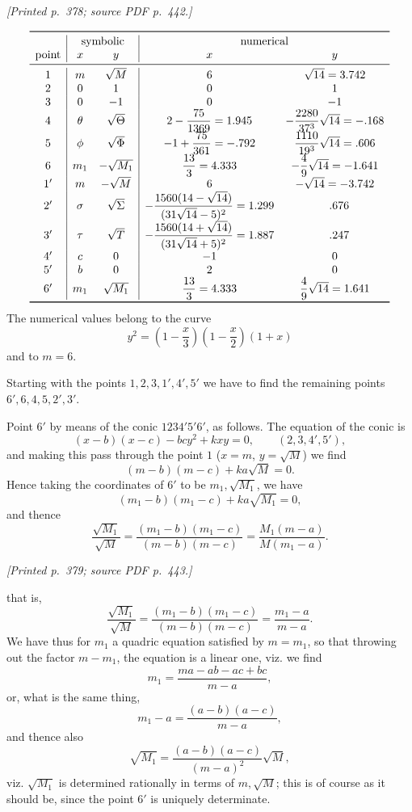 \documentclass[11pt,a4paper]{article}
\newcommand{\sourcepage}[2]{\par\smallskip\noindent\textit{[Printed p.~#1; source PDF p.~#2.]}\par\smallskip}
\begin{document}
\sourcepage{378}{442}
\[
\begin{array}{c|cc|cc}
\toprule
& \multicolumn{2}{c|}{\text{symbolic}} & \multicolumn{2}{c}{\text{numerical}}\\
\text{point} & x & y & x & y\\
\midrule
1  & m       & \sqrt M     & 6 & \sqrt{14}=3.742\\
2  & 0       & 1           & 0 & 1\\
3  & 0       & -1          & 0 & -1\\
4  & \theta  & \sqrt\Theta & 2-\dfrac{75}{1369}=1.945
   & -\dfrac{2280}{37^3}\sqrt{14}=-.168\\
5  & \phi    & \sqrt\Phi   & -1+\dfrac{75}{361}=-.792
   & \dfrac{1110}{19^3}\sqrt{14}=.606\\
6  & m_1     & -\sqrt{M_1} & \dfrac{13}{3}=4.333
   & -\dfrac49\sqrt{14}=-1.641\\
1' & m       & -\sqrt M    & 6 & -\sqrt{14}=-3.742\\
2' & \sigma  & \sqrt\Sigma & -\dfrac{1560(14-\sqrt{14})}{(31\sqrt{14}-5)^2}=1.299
   & \phantom{-}.676\\
3' & \tau    & \sqrt T     & -\dfrac{1560(14+\sqrt{14})}{(31\sqrt{14}+5)^2}=1.887
   & \phantom{-}.247\\
4' & c       & 0           & -1 & 0\\
5' & b       & 0           & 2  & 0\\
6' & m_1     & \sqrt{M_1}  & \dfrac{13}{3}=4.333
   & \dfrac49\sqrt{14}=1.641\\
\bottomrule
\end{array}
\]
The numerical values belong to the curve
\[
y^2=\left(1-\frac{x}{3}\right)\left(1-\frac{x}{2}\right)(1+x)
\]
and to $m=6$.

Starting with the points $1,2,3,1',4',5'$ we have to find the remaining points
$6',6,4,5,2',3'$.

Point $6'$ by means of the conic $1234'5'6'$, as follows. The equation of the conic is
\[
(x-b)(x-c)-bcy^2+kxy=0,\qquad (2,3,4',5'),
\]
and making this pass through the point $1$ ($x=m$, $y=\sqrt M$) we find
\[
(m-b)(m-c)+ka\sqrt M=0.\tag{1}
\]
Hence taking the coordinates of $6'$ to be $m_1,\sqrt{M_1}$, we have
\[
(m_1-b)(m_1-c)+ka\sqrt{M_1}=0,\tag{$6'$}
\]
and thence
\[
\frac{\sqrt{M_1}}{\sqrt M}
=\frac{(m_1-b)(m_1-c)}{(m-b)(m-c)}
=\frac{M_1(m-a)}{M(m_1-a)}.
\]

\sourcepage{379}{443}
that is,
\[
\frac{\sqrt{M_1}}{\sqrt M}
=\frac{(m_1-b)(m_1-c)}{(m-b)(m-c)}
=\frac{m_1-a}{m-a}.
\]
We have thus for $m_1$ a quadric equation satisfied by $m=m_1$, so that throwing out
the factor $m-m_1$, the equation is a linear one, viz. we find
\[
m_1=\frac{ma-ab-ac+bc}{m-a},
\]
or, what is the same thing,
\[
m_1-a=\frac{(a-b)(a-c)}{m-a},
\]
and thence also
\[
\sqrt{M_1}=\frac{(a-b)(a-c)}{(m-a)^2}\sqrt M,
\]
viz. $\sqrt{M_1}$ is determined rationally in terms of $m,\sqrt M$; this is of course as
it should be, since the point $6'$ is uniquely determinate.
\end{document}
